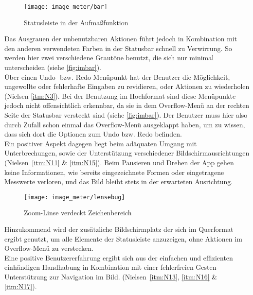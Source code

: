 \begin{wrapfigure}{R}{0.5\textwidth}
  \centering
  \texttt{[image: image\_meter/bar]}
  \caption{Statusleiste in der Aufmaßfunktion}
  \label{fig:imbar}
\end{wrapfigure}

Das Ausgrauen der unbenutzbaren Aktionen führt jedoch in Kombination mit den anderen verwendeten Farben in der Statusbar schnell zu Verwirrung.
So werden hier zwei verschiedene Grautöne benutzt, die sich nur minimal unterscheiden (siehe \autoref{fig:imbar}).  \\

Über einen Undo- bzw. Redo-Menüpunkt hat der Benutzer die Möglichkeit, ungewollte oder fehlerhafte Eingaben zu revidieren, oder Aktionen zu wiederholen (Nielsen \autoref{itm:N3}).
Bei der Benutzung im Hochformat sind diese Menüpunkte jedoch nicht offensichtlich erkennbar, da sie in dem Overflow-Menü  an der rechten Seite der Statusbar versteckt sind (siehe \autoref{fig:imbar}).
Der Benutzer muss hier also durch Zufall schon einmal das Overflow-Menü ausgeklappt haben, um zu wissen, dass sich dort die Optionen zum Undo bzw. Redo befinden. \\

Ein positiver Aspekt dagegen liegt beim adäquaten Umgang mit Unterbrechungen, sowie der Unterstützung verschiedener Bildschirmausrichtungen (Nielsen~\autoref{itm:N11} \& \autoref{itm:N15}).
Beim Pausieren und Drehen der App gehen keine Informationen, wie bereits eingezeichnete Formen oder eingetragene Messwerte verloren, und das Bild bleibt stets in der erwarteten Ausrichtung. 

\begin{wrapfigure}{R}{0.5\textwidth}
  \centering
  \texttt{[image: image\_meter/lensebug]}
  \caption{Zoom-Linse verdeckt Zeichenbereich}
  \label{fig:imlense}
\end{wrapfigure}

Hinzukommend wird der zusätzliche Bildschirmplatz der sich im Querformat ergibt genutzt, um alle Elemente der Statusleiste anzuzeigen, ohne Aktionen im Overflow-Menü zu verstecken. \\

Eine positive Benutzererfahrung ergibt sich aus der einfachen und effizienten einhändigen Handhabung in Kombination mit einer fehlerfreien Gesten-Unterstützung zur Navigation im Bild. (Nielsen~\autoref{itm:N13}, \autoref{itm:N16} \& \autoref{itm:N17}). \\

